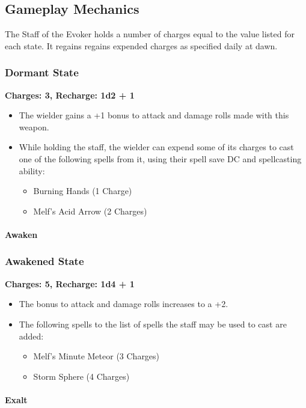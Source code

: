 \subsection*{Gameplay Mechanics}
{\entryfont The Staff of the Evoker holds a number of charges equal to the value listed for each state. It regains regains expended charges as specified daily at dawn.
\subsubsection*{Dormant State}
\textbf{Charges: 3, Recharge: 1d2 + 1}
\begin{itemize}
	\item The wielder gains a +1 bonus to attack and damage rolls made with this weapon.
	\item While holding the staff, the wielder can expend some of its charges to cast one of the following spells from it, using their spell save DC and spellcasting ability:
	\begin{itemize}
		\item Burning Hands (1 Charge)
		\item Melf's Acid Arrow (2 Charges)
	\end{itemize}
\end{itemize}
\paragraph*{Awaken}
\subsubsection*{Awakened State}
\textbf{Charges: 5, Recharge: 1d4 + 1}
\begin{itemize}
	\item The bonus to attack and damage rolls increases to a +2.
	\item The following spells to the list of spells the staff may be used to cast are added:
	\begin{itemize}
		\item Melf's Minute Meteor (3 Charges)
		\item Storm Sphere (4 Charges)
	\end{itemize}
\end{itemize}
\paragraph*{Exalt}
}
